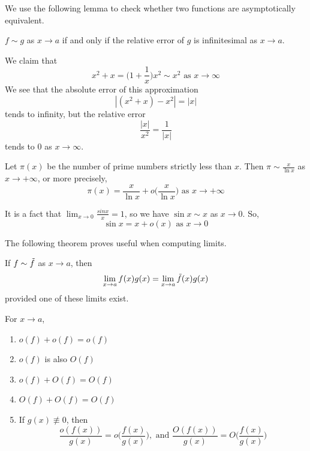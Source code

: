 \documentclass{article}
\begin{document}
    We use the following lemma to check whether two functions are asymptotically equivalent. 
    \begin{lemma}
      $f \sim g$ as $x \rightarrow a$ if and only if the relative error of $g$ is infinitesimal as $x \rightarrow a$. 
    \end{lemma}

    \begin{example}
      We claim that 
      \[x^2 + x = \bigg(1 + \frac{1}{x} \bigg) x^2 \sim x^2 \text{ as } x \rightarrow \infty\]
      We see that the absolute error of this approximation 
      \[|(x^2 + x) - x^2| = |x|\]
      tends to infinity, but the relative error
      \[\frac{|x|}{x^2} = \frac{1}{|x|}\]
      tends to $0$ as $x \rightarrow \infty$. 
    \end{example}

    \begin{theorem}
    Let $\pi(x)$ be the number of prime numbers strictly less than $x$. Then $\pi \sim \frac{x}{\ln{x}}$ as $x\rightarrow + \infty$, or more precisely, 
    \[\pi(x) = \frac{x}{\ln{x}} + o \bigg( \frac{x}{\ln{x}}\bigg) \text{ as } x \rightarrow +\infty\]
    \end{theorem}

    \begin{example}
      It is a fact that $\lim_{x\rightarrow 0} \frac{sin{x}}{x} = 1$, so we have $\sin{x} \sim x$ as $x \rightarrow 0$. So,
      \[\sin{x} = x + o(x) \text{ as } x \rightarrow 0\]
    \end{example}

    The following theorem proves useful when computing limits. 
    \begin{theorem}
    If $f \sim \Tilde{f}$ as $x \rightarrow a$, then 
    \[\lim_{x \rightarrow a} f(x) g(x) = \lim_{x \rightarrow a} \Tilde{f}(x) g(x)\]
    provided one of these limits exist. 
    \end{theorem}

    \begin{theorem}
    For $x \rightarrow a$, 
    \begin{enumerate}
      \item $o(f) + o(f) = o(f)$
      \item $o(f)$ is also $O(f)$
      \item $o(f) + O(f) = O(f)$
      \item $O(f) + O(f) = O(f)$
      \item If $g(x) \not\equiv 0$, then 
      \[\frac{o(f(x))}{g(x)} = o \bigg( \frac{f(x)}{g(x)} \bigg), \text{ and } \frac{O(f(x))}{g(x)} = O \bigg( \frac{f(x)}{g(x)} \bigg)\]
    \end{enumerate}
    \end{theorem}
\end{document}
